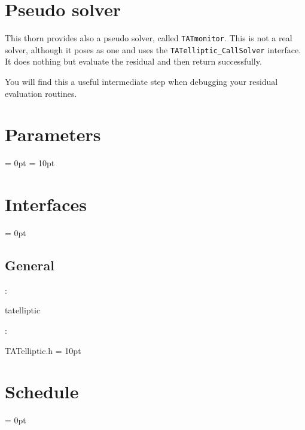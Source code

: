 \section{Pseudo solver}

This thorn provides also a pseudo solver, called \texttt{TATmonitor}.
This is not a real solver, although it poses as one and uses the
\texttt{TATelliptic\_CallSolver} interface.  It does nothing but
evaluate the residual and then return successfully.

You will find this a useful intermediate step when debugging your
residual evaluation routines.







\section{Parameters} 


\parskip = 0pt
\parskip = 10pt 

\section{Interfaces} 


\parskip = 0pt

\vspace{3mm} \subsection*{General}

: 

tatelliptic
\vspace{2mm}

\vspace{5mm}

: 



TATelliptic.h
\vspace{2mm}\parskip = 10pt 

\section{Schedule} 


\parskip = 0pt



